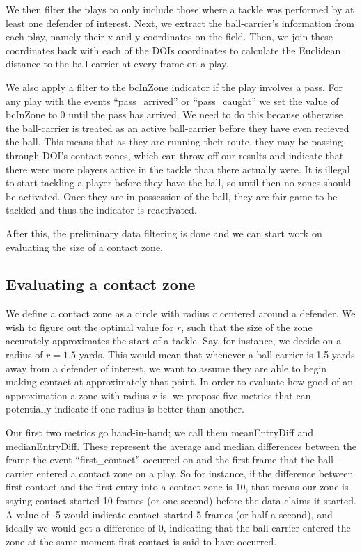 \documentclass[
  12pt]{article}
\begin{document}
We then filter the plays to only include those where a tackle was
performed by at least one defender of interest. Next, we extract the
ball-carrier's information from each play, namely their x and y
coordinates on the field. Then, we join these coordinates back with each
of the DOIs coordinates to calculate the Euclidean distance to the ball
carrier at every frame on a play.

We also apply a filter to the bcInZone indicator if the play involves a
pass. For any play with the events ``pass\_arrived'' or ``pass\_caught''
we set the value of bcInZone to 0 until the pass has arrived. We need to
do this because otherwise the ball-carrier is treated as an active
ball-carrier before they have even recieved the ball. This means that as
they are running their route, they may be passing through DOI's contact
zones, which can throw off our results and indicate that there were more
players active in the tackle than there actually were. It is illegal to
start tackling a player before they have the ball, so until then no
zones should be activated. Once they are in possession of the ball, they
are fair game to be tackled and thus the indicator is reactivated.

After this, the preliminary data filtering is done and we can start work
on evaluating the size of a contact zone.

\subsection{Evaluating a contact zone}\label{evaluating-a-contact-zone}

We define a contact zone as a circle with radius \(r\) centered around a
defender. We wish to figure out the optimal value for \(r\), such that
the size of the zone accurately approximates the start of a tackle. Say,
for instance, we decide on a radius of \(r = 1.5\) yards. This would
mean that whenever a ball-carrier is 1.5 yards away from a defender of
interest, we want to assume they are able to begin making contact at
approximately that point. In order to evaluate how good of an
approximation a zone with radius \(r\) is, we propose five metrics that
can potentially indicate if one radius is better than another.

Our first two metrics go hand-in-hand; we call them meanEntryDiff and
medianEntryDiff. These represent the average and median differences
between the frame the event ``first\_contact'' occurred on and the first
frame that the ball-carrier entered a contact zone on a play. So for
instance, if the difference between first contact and the first entry
into a contact zone is 10, that means our zone is saying contact started
10 frames (or one second) before the data claims it started. A value of
-5 would indicate contact started 5 frames (or half a second), and
ideally we would get a difference of 0, indicating that the ball-carrier
entered the zone at the same moment first contact is said to have
occurred.
\end{document}
